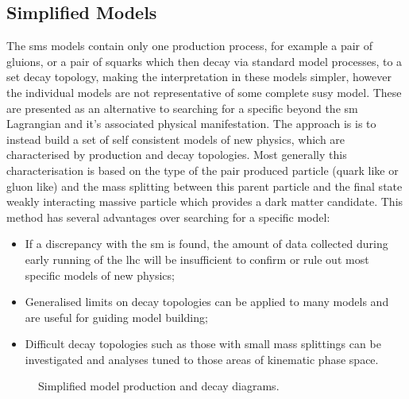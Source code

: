 \subsection{Simplified Models} %
\label{sub:simplified_models}
The \ac{sms} models contain only one production process, for example a pair of gluions, or a pair of squarks which then decay via standard model processes, to a set decay topology, making the interpretation in these models simpler, however the individual models are not representative of some complete \ac{susy} model. 
These are presented as an alternative to searching for a specific beyond the 
\ac{sm} Lagrangian and it's associated physical manifestation. The 
approach is is to  instead build a set of self consistent models of new 
physics, which are characterised by production and decay 
topologies.
Most generally this characterisation is based on the type of the pair produced 
particle (quark like or gluon like) and the mass splitting between this parent 
particle and the final state weakly interacting massive particle which provides 
a dark matter candidate.
This method has several advantages over searching for a specific model:
\begin{itemize}
\item If a discrepancy with the \ac{sm} is found, the amount of data collected  
during early running of the \ac{lhc} will be insufficient to confirm or rule 
out most specific models of new physics;
\item Generalised limits on decay topologies can be applied to many models and 
are useful for guiding model building;
\item Difficult decay topologies such as those with small mass 
splittings can be investigated and analyses tuned to those areas of kinematic 
phase space.
\end{itemize}



\begin{figure}[h!]
    \centering
    \caption{Simplified model production and decay diagrams.}
    \label{fig:T1T2feyn}
\end{figure}



